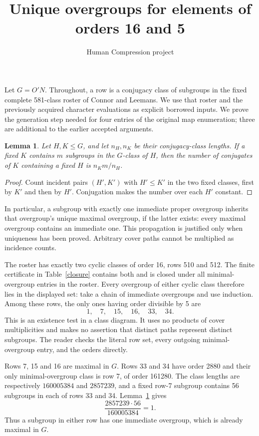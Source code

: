 \documentclass[11pt,a4paper]{article}
\title{Unique overgroups for elements of orders 16 and 5}
\author{Human Compression project}\date{}
\newtheorem{lemma}{Lemma}\newtheorem{theorem}[lemma]{Theorem}
\begin{document}
\maketitle
Let $G=O'N$. Throughout, a row is a conjugacy class of subgroups in
the fixed complete 581-class roster of Connor and Leemans. We use
that roster and the previously acquired character evaluations as
explicit borrowed inputs. We prove the generation step needed for
four entries of the original map enumeration; three are additional
to the earlier accepted arguments.

\begin{lemma}\label{incidence}
Let $H,K\leq G$, and let $n_H,n_K$ be their conjugacy-class lengths.
If a fixed $K$ contains $m$ subgroups in the $G$-class of $H$, then
the number of conjugates of $K$ containing a fixed $H$ is
$n_Km/n_H$.
\end{lemma}
\begin{proof}
Count incident pairs $(H',K')$ with $H'\leq K'$ in the two fixed
classes, first by $K'$ and then by $H'$. Conjugation makes the number
over each $H'$ constant.
\end{proof}
In particular, a subgroup with exactly one immediate proper
overgroup inherits that overgroup's unique maximal overgroup, if
the latter exists: every maximal overgroup contains an immediate
one. This propagation is justified only when uniqueness has been
proved. Arbitrary cover paths cannot be multiplied as incidence counts.

The roster has exactly two cyclic classes of order 16, rows 510 and
512. The finite certificate in Table~\ref{closure} contains both and
is closed under all minimal-overgroup entries in the roster. Every
overgroup of either cyclic class therefore lies in the displayed
set: take a chain of immediate overgroups and use induction.
Among these rows, the only ones having order divisible by 5 are
\[
1,\quad7,\quad15,\quad16,\quad33,\quad34.
\]
This is an existence test in a class diagram. It uses no products of
cover multiplicities and makes no assertion that distinct paths
represent distinct subgroups. The reader checks the literal row set,
every outgoing minimal-overgroup entry, and the orders directly.

Rows 7, 15 and 16 are maximal in $G$. Rows 33 and 34 have order 2880
and their only minimal-overgroup class is row 7, of order 161280.
The class lengths are respectively $160005384$ and $2857239$, and a
fixed row-7 subgroup contains 56 subgroups in each of rows 33 and 34.
Lemma~\ref{incidence} gives
\[
\frac{2857239\cdot56}{160005384}=1.
\]
Thus a subgroup in either row has one immediate overgroup, which is
already maximal in $G$.
\end{document}
